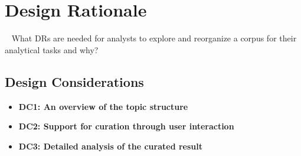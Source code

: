\section{Design Rationale}~\label{sec: design_rationale}
What DRs are needed for analysts to explore and reorganize a corpus for their analytical tasks and why?
\subsection{Design Considerations}
\begin{itemize}
    \setlength\itemsep{0em}
      \item \textbf{DC1: An overview of the topic structure} 
      \item \textbf{DC2: Support for curation through user interaction } 
      \item \textbf{DC3: Detailed analysis of the curated result } 
  \end{itemize}